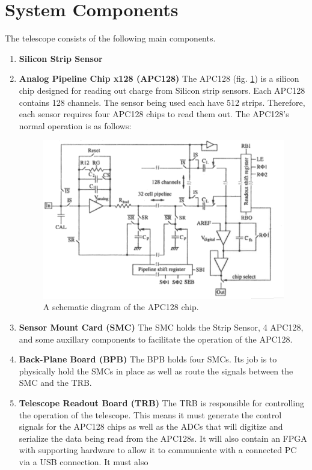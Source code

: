 \documentclass{article}
\newcommand{\itemt}[1]{\item \textbf{#1}}
\begin{document}
\section{System Components}
The telescope consists of the following main components.
\begin{enumerate}
  \itemt{Silicon Strip Sensor}
  \itemt{Analog Pipeline Chip x128 (APC128)}
    The APC128 (fig. \ref{fig:APC128_Schematic}) is a silicon chip designed for reading out charge from Silicon strip sensors. Each APC128 contains 128 channels. The sensor being used each have 512 strips. Therefore, each sensor requires four APC128 chips to read them out. The APC128's normal operation is as follows:

    \begin{figure}[h]
      \centering
      \includegraphics{./figures/APC128_Schematic.png}
      \caption{A schematic diagram of the APC128 chip.}
      \label{fig:APC128_Schematic}
    \end{figure}

  \itemt{Sensor Mount Card (SMC)}
    The SMC holds the Strip Sensor, 4 APC128, and some auxillary components to facilitate the operation of the APC128.  
  \itemt{Back-Plane Board (BPB)}
    The BPB holds four SMCs. Its job is to physically hold the SMCs in place as well as route the signals between the SMC and the TRB. 
  \itemt{Telescope Readout Board (TRB)}
    The TRB is responsible for controlling the operation of the telescope. This means it must generate the control signals for the APC128 chips as well as the ADCs that will digitize and serialize the data being read from the APC128s. It will also contain an FPGA with supporting hardware to allow it to communicate with a connected PC via a USB connection. It must also
\end{enumerate}
\end{document}
